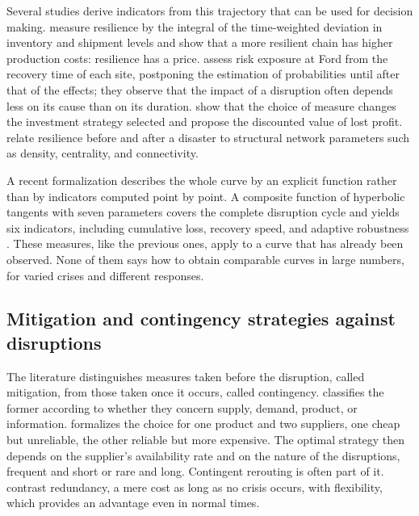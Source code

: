 Several studies derive indicators from this trajectory that can be used for decision making. \citet{spiegler2012} measure resilience by the integral of the time-weighted deviation in inventory and shipment levels and show that a more resilient chain has higher production costs: resilience has a price. \citet{simchilevi2015} assess risk exposure at Ford from the recovery time of each site, postponing the estimation of probabilities until after that of the effects; they observe that the impact of a disruption often depends less on its cause than on its duration. \citet{behzadi2020} show that the choice of measure changes the investment strategy selected and propose the discounted value of lost profit. \citet{dixit2020} relate resilience before and after a disaster to structural network parameters such as density, centrality, and connectivity.

A recent formalization describes the whole curve by an explicit function rather than by indicators computed point by point. A composite function of hyperbolic tangents with seven parameters covers the complete disruption cycle and yields six indicators, including cumulative loss, recovery speed, and adaptive robustness \citep{rahiel2026in4pl, rahiel2026these}. These measures, like the previous ones, apply to a curve that has already been observed. None of them says how to obtain comparable curves in large numbers, for varied crises and different responses.

\subsection{Mitigation and contingency strategies against disruptions}
\label{sec:ea-strategies}

The literature distinguishes measures taken before the disruption, called mitigation, from those taken once it occurs, called contingency. \citet{tang2006} classifies the former according to whether they concern supply, demand, product, or information. \citet{tomlin2006} formalizes the choice for one product and two suppliers, one cheap but unreliable, the other reliable but more expensive. The optimal strategy then depends on the supplier's availability rate and on the nature of the disruptions, frequent and short or rare and long. Contingent rerouting is often part of it. \citet{sheffirice2005} contrast redundancy, a mere cost as long as no crisis occurs, with flexibility, which provides an advantage even in normal times.

